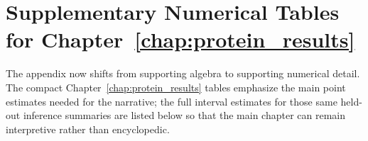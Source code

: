 

\section{Supplementary Numerical Tables for Chapter~\ref{chap:protein_results}}

The appendix now shifts from supporting algebra to supporting numerical detail. The compact Chapter~\ref{chap:protein_results} tables emphasize the main point estimates needed for the narrative; the full interval estimates for those same held-out inference summaries are listed below so that the main chapter can remain interpretive rather than encyclopedic.


